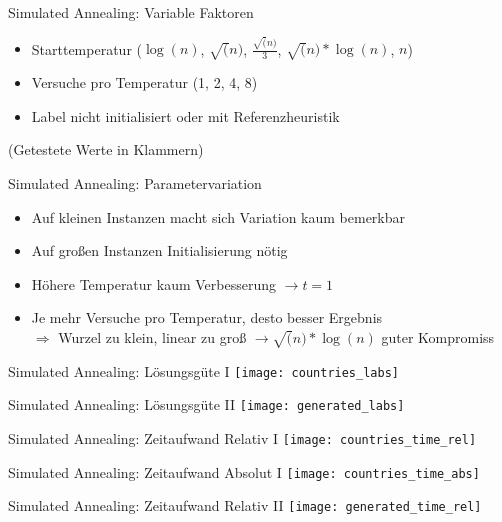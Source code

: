 \documentclass[ngerman,aspectratio=169,10pt]{beamer}
\begin{document}
\begin{frame}{Simulated Annealing: Variable Faktoren}
    \begin{itemize} 
    \item Starttemperatur ($\log(n)$, $\sqrt(n)$, $\frac{\sqrt(n)}{3}$, $\sqrt(n)*\log(n)$, $n$)
    \item Versuche pro Temperatur (1, 2, 4, 8)
    \item Label nicht initialisiert oder mit Referenzheuristik
    \end{itemize} 
    (Getestete Werte in Klammern)
\end{frame}

\begin{frame}{Simulated Annealing: Parametervariation}
    \begin{itemize} 
    \item Auf kleinen Instanzen macht sich Variation kaum bemerkbar
    \item Auf großen Instanzen Initialisierung nötig
    \item Höhere Temperatur kaum Verbesserung $\rightarrow t=1$
    \item Je mehr Versuche pro Temperatur, desto besser Ergebnis\\
    $\Longrightarrow$ Wurzel zu klein, linear zu groß $\rightarrow \sqrt(n)*\log(n)$ guter Kompromiss
    
    \end{itemize} 
\end{frame}

\begin{frame}{Simulated Annealing: Lösungsgüte I}
    \centering
    \texttt{[image: countries\_labs]}
\end{frame}

\begin{frame}{Simulated Annealing: Lösungsgüte II}
    \centering
    \texttt{[image: generated\_labs]}
\end{frame}

\begin{frame}{Simulated Annealing: Zeitaufwand Relativ I}
    \centering
    \texttt{[image: countries\_time\_rel]}
\end{frame}

\begin{frame}{Simulated Annealing: Zeitaufwand Absolut I}
    \centering
    \texttt{[image: countries\_time\_abs]}
\end{frame}

\begin{frame}{Simulated Annealing: Zeitaufwand Relativ II}
    \centering
    \texttt{[image: generated\_time\_rel]}
\end{frame}
\end{document}
